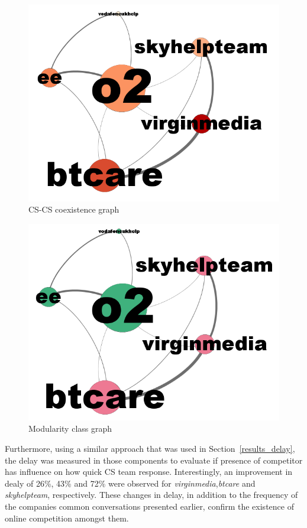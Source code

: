 \documentclass[sigconf]{acmart}
\begin{document}
\begin{figure}[htb]
\centering
\includegraphics[width=\columnwidth]{images/coexistencegraph.png}
\caption{CS-CS coexistence graph}
\label{fig:coexistencegraph}
\end{figure}

\begin{figure}[htb]
\centering
\includegraphics[width=\columnwidth]{images/modularityclassgraph.png}
\caption{Modularity class graph}
\label{fig:modularityclassgraph}
\end{figure}

Furthermore, using a similar approach that was used in
Section~\ref{results_delay}, the delay was measured in those
components to evaluate if presence of competitor has influence on how
quick CS team response. Interestingly, an improvement in dealy of 26\%, 43\%
and 72\% were observed for {\emph{virginmedia}},{\emph{btcare}} and
{\emph{skyhelpteam}}, respectively. These changes in delay, in addition to
the frequency of the companies common conversations presented earlier, 
confirm the existence of online competition amongst them.
\end{document}
